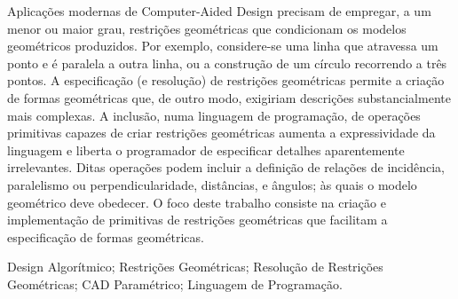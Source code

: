 \begin{resumo}
Aplicações modernas de Computer-Aided Design precisam de empregar, a um menor ou
maior grau, restrições geométricas que condicionam os modelos geométricos
produzidos.  Por exemplo, considere-se uma linha que atravessa um ponto e é
paralela a outra linha, ou a construção de um círculo recorrendo a três pontos.
A especificação (e resolução) de restrições geométricas permite a criação de
formas geométricas que, de outro modo, exigiriam descrições substancialmente
mais complexas.  A inclusão, numa linguagem de programação, de operações
primitivas capazes de criar restrições geométricas aumenta a expressividade da
linguagem e liberta o programador de especificar detalhes aparentemente
irrelevantes.  Ditas operações podem incluir a definição de relações de
incidência, paralelismo ou perpendicularidade, distâncias, e ângulos; às quais o
modelo geométrico deve obedecer.  O foco deste trabalho consiste na criação e
implementação de primitivas de restrições geométricas que facilitam a
especificação de formas geométricas.
\end{resumo}

\begin{palavraschave}
\noindent
Design Algorítmico;
Restrições Geométricas;
Resolução de Restrições Geométricas;
CAD Paramétrico;
Linguagem de Programação.
\end{palavraschave}

\clearpage
\thispagestyle{empty}
